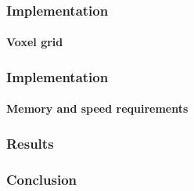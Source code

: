\documentclass{beamer}
\begin{document}
  \begin{frame}
    \frametitle{Implementation}
    \framesubtitle{Voxel grid}
  \end{frame}
  
  \begin{frame}
    \frametitle{Implementation}
    \framesubtitle{Memory and speed requirements}
  \end{frame}
  
  
  
  
  
  \begin{frame}
    \frametitle{Results}
  \end{frame}
  
  \begin{frame}
    \frametitle{Conclusion}
  \end{frame}
  
\end{document}
